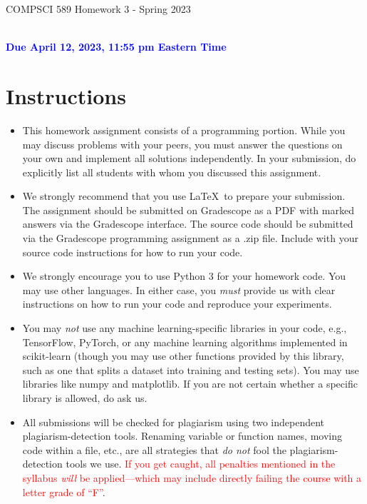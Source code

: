 \documentclass[letterpaper]{article}
\newcommand{\HIGHLIGHT}[1]{\textcolor{blue}{\textbf{#1}}}
\begin{document}
\newpage
\begin{center}
    \begin{Large}
    COMPSCI 589 Homework 3 - Spring 2023
    \end{Large}
    \\
    \HIGHLIGHT{Due April 12, 2023, 11:55 pm Eastern Time}
\end{center}



\vspace{0.25in}
\section{Instructions}

\begin{itemize}
    \item This homework assignment consists of a programming portion. While you may discuss problems with your peers, you must answer the questions on your own and implement all solutions independently. In your submission, do explicitly list all students with whom you discussed this assignment. 
    \item We strongly recommend that you use \LaTeX~to prepare your submission. The assignment should be submitted on Gradescope as a PDF with marked answers via the Gradescope interface. The source code should be submitted via the Gradescope programming assignment as a .zip file. Include with your source code instructions for how to run your code. 
    \item We strongly encourage you to use Python 3 for your homework code. You may use other languages. In either case, you \textit{must} provide us with clear instructions on how to run your code and reproduce your experiments. 
    \item You may \textit{not} use any machine learning-specific libraries in your code, e.g., TensorFlow, PyTorch, or any machine learning algorithms implemented in scikit-learn (though you may use other functions provided by this library, such as one that splits a dataset into training and testing sets). You may use libraries like numpy and matplotlib. If you are not certain whether a specific library is allowed, do ask us.
    \item All submissions will be checked for plagiarism using two independent plagiarism-detection tools. Renaming variable or function names, moving code within a file, etc., are all strategies that \textit{do not} fool the plagiarism-detection tools we use. \textcolor{red}{If you get caught, all penalties mentioned in the syllabus \textit{will} be applied---which may include directly failing the course with a letter grade of ``F''}.

\end{itemize}
\end{document}
